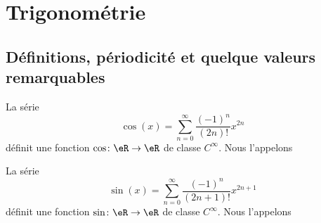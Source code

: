 
\section{Trigonométrie}

\subsection{Définitions, périodicité et quelque valeurs remarquables}

\begin{propositionDef}        \label{PROPooZXPVooBjONka}
    La série
    \begin{equation}
        \cos(x)=\sum_{n=0}^{\infty}\frac{ (-1)^n }{ (2n)! }x^{2n}
    \end{equation}
    définit une fonction \( \cos\colon \eR\to \eR\) de classe \(  C^{\infty}\). Nous l'appelons 

    La série
    \begin{equation}        \label{EQooCMRFooCTtpge}
        \sin(x)=\sum_{n=0}^{\infty}\frac{ (-1)^n }{ (2n+1)! }x^{2n+1}
    \end{equation}
    définit une fonction \( \sin\colon \eR\to \eR\) de classe \(  C^{\infty}\). Nous l'appelons 
\end{propositionDef}

